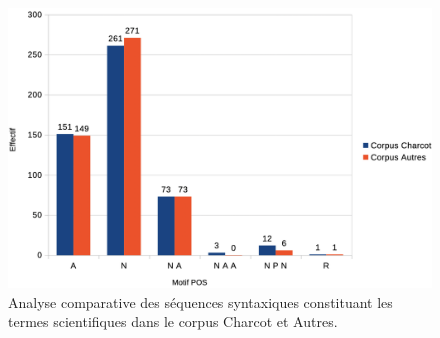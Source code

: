 \begin{figure}[h] %
	\centering
	\includegraphics[width=\linewidth]{img/repartition_motifs_POS.png}
	\caption{Analyse comparative des séquences syntaxiques constituant les termes scientifiques dans le corpus \og{}Charcot\fg{} et \og{}Autres\fg{}.}
	\label{fig:repartition_POS}
\end{figure}

